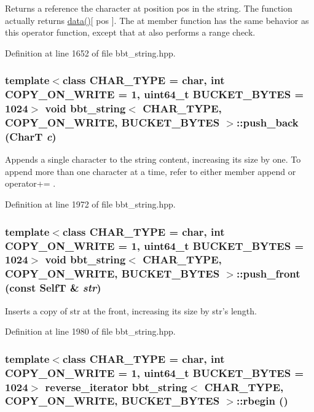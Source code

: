 Returns a reference the character at position pos in the string. The function actually returns \hyperlink{classbbt__string_bd225f98ab68e2385b6d3e23bd4719cb}{data()}\mbox{[} pos \mbox{]}. The at member function has the same behavior as this operator function, except that at also performs a range check. 

Definition at line 1652 of file bbt\_\-string.hpp.\hypertarget{classbbt__string_a458692ed9ffa90e7634f36b3944bda2}{
\subsubsection[{push\_\-back}]{\setlength{\rightskip}{0pt plus 5cm}template$<$class CHAR\_\-TYPE  = char, int COPY\_\-ON\_\-WRITE = 1, uint64\_\-t BUCKET\_\-BYTES = 1024$>$ void {\bf bbt\_\-string}$<$ CHAR\_\-TYPE, COPY\_\-ON\_\-WRITE, BUCKET\_\-BYTES $>$::push\_\-back (CharT {\em c})}}
\label{classbbt__string_a458692ed9ffa90e7634f36b3944bda2}


Appends a single character to the string content, increasing its size by one. To append more than one character at a time, refer to either member append or operator+= . 

Definition at line 1972 of file bbt\_\-string.hpp.\hypertarget{classbbt__string_c4c5765d2a4ea6575342f460e10f70ba}{
\subsubsection[{push\_\-front}]{\setlength{\rightskip}{0pt plus 5cm}template$<$class CHAR\_\-TYPE  = char, int COPY\_\-ON\_\-WRITE = 1, uint64\_\-t BUCKET\_\-BYTES = 1024$>$ void {\bf bbt\_\-string}$<$ CHAR\_\-TYPE, COPY\_\-ON\_\-WRITE, BUCKET\_\-BYTES $>$::push\_\-front (const {\bf SelfT} \& {\em str})}}
\label{classbbt__string_c4c5765d2a4ea6575342f460e10f70ba}


Inserts a copy of str at the front, increasing its size by str's length. 

Definition at line 1980 of file bbt\_\-string.hpp.\hypertarget{classbbt__string_f65ad28bf03b76f6fe2dee8cc866a2e0}{
\subsubsection[{rbegin}]{\setlength{\rightskip}{0pt plus 5cm}template$<$class CHAR\_\-TYPE  = char, int COPY\_\-ON\_\-WRITE = 1, uint64\_\-t BUCKET\_\-BYTES = 1024$>$ reverse\_\-iterator {\bf bbt\_\-string}$<$ CHAR\_\-TYPE, COPY\_\-ON\_\-WRITE, BUCKET\_\-BYTES $>$::rbegin ()}}
\label{classbbt__string_f65ad28bf03b76f6fe2dee8cc866a2e0}


